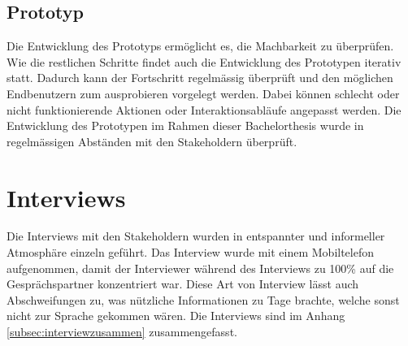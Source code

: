 \subsection{Prototyp}
Die Entwicklung des Prototyps ermöglicht es, die Machbarkeit zu überprüfen. Wie die restlichen Schritte findet auch die Entwicklung des Prototypen iterativ statt. Dadurch kann der Fortschritt regelmässig überprüft und den möglichen Endbenutzern zum ausprobieren vorgelegt werden. Dabei können schlecht oder nicht funktionierende Aktionen oder Interaktionsabläufe angepasst werden. Die Entwicklung des Prototypen im Rahmen dieser Bachelorthesis wurde in regelmässigen Abständen mit den Stakeholdern überprüft.


\section{Interviews}
\label{sec:interviews}

Die Interviews mit den Stakeholdern wurden in entspannter und informeller Atmosphäre einzeln geführt. Das Interview wurde mit einem Mobiltelefon aufgenommen, damit der Interviewer während des Interviews zu 100\% auf die Gesprächspartner konzentriert war. Diese Art von Interview lässt auch Abschweifungen zu, was nützliche Informationen zu Tage brachte, welche sonst nicht zur Sprache gekommen wären. Die Interviews sind im Anhang \ref{subsec:interviewzusammen} zusammengefasst.
